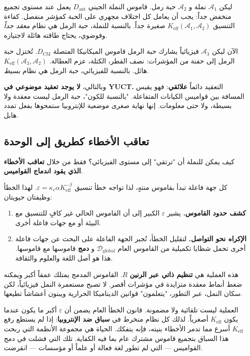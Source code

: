\documentclass[12pt,a4paper]{article}
\newcommand{\Keff}{K_{\mathrm{eff}}}
\begin{document}
	ليكن \(\mathcal{A}_1\) نملة و \(\mathcal{A}_2\) حبة رمل. قاموس النملة الجيني \(D_{\text{ant}}\) يعمل عند مستوى تجميع منخفض جداً: يجب أن يعامل كل اختلاف مجهري على الحبة كمؤشر منفصل. كفاءة التنسيق \(\Keff(\mathcal{A}_1, \mathcal{A}_2)\) صغيرة جداً. بالنسبة للنملة، حبة الرمل هي نظام \emph{معقد جداً} وفوضوي، يحتاج طاقته هائلة لاجتيازه.
	
	الآن ليكن \(\mathcal{A}_3\) فيزيائياً يشارك حبة الرمل قاموس الميكانيكا المتصلة \(D_{\text{CM}}\). تُختزل حبة الرمل إلى حفنة من المؤشرات: نصف القطر، الكتلة، عزم العطالة. \(\Keff(\mathcal{A}_3, \mathcal{A}_2)\) هائل. بالنسبة للفيزيائي، حبة الرمل هي نظام \emph{بسيط}.
	
	وبالتالي، \textbf{لا يوجد تعقيد موضوعي في YUCT.} التعقيد دائماً \textbf{علائقي}: فهو يقيس المسافة بين قواميس الكيانات المتفاعلة. "بالنسبة للكون"، حبة الرمل ليست معقدة ولا بسيطة، ولا حتى معلومات. إنها نهاية صغرى موضعية للإنتروبيا ستمحوها بفعل تمدد هابل.
	
	\subsection{تعاقب الأخطاء كطريق إلى الوحدة}
	\label{subsec:cascade}
	
	كيف يمكن للنملة أن "ترتقي" إلى مستوى الفيزيائي؟ فقط من خلال \textbf{تعاقب الأخطاء الذي يقود اندماج القواميس}.
	
	كل جهة فاعلة تبدأ بقاموس منتهٍ، لذا تواجه خطأ تنسيق \(\varepsilon = \kappa_c \alpha \Keff^{-\beta}\). لهذا الخطأ وظيفتان حيويتان:
	
	\begin{enumerate}[leftmargin=*]
		\item \textbf{كشف حدود القاموس.} يشير \(\varepsilon\) الكبير إلى أن القاموس الحالي غير كافٍ للتنسيق مع البيئة أو مع جهات فاعلة أخرى.
		\item \textbf{الإكراه نحو التواصل.} لتقليل الخطأ، تُجبر الجهة الفاعلة على البحث عن جهات فاعلة أخرى تحمل شظايا تكميلية من القاموس العام \(\mathcal{D}_{\text{global}}\) و \textbf{دمج} قاموسها مع قاموسها. هذا هو أصل اللغة والعلوم والثقافة.
	\end{enumerate}
	
	هذه العملية هي \textbf{تنظيم ذاتي عبر الرنين} \(R\). القاموس المدمج يمتلك عمقاً أكبر ويمكنه ضغط أنماط معقدة متزايدة في مؤشرات أقصر. لا تصبح مستعمرة النمل فيزيائياً، لكن سكان النمل، عبر التطور، "يتعلمون" قوانين الديناميكا الحرارية ويبنون أعشاشاً تطيعها.
	
	العملية ليست تلقائية ولا مضمونة. قانون الخطأ العام يضمن أن \(\varepsilon\) أكبر ما يكون عندما يكون \(\Keff\) أصغرياً. لذلك كل نظام منخرط في \textbf{سباق ضد الإنتروبيا}: إذا لم يستطع رفع \(\Keff\) أسرع مما تدمر الأخطاء بنيته، فإنه يتفكك. الحياة هي مجموعة الأنظمة التي ربحت هذا السباق بتجميع قاموس مشترك عام بما فيه الكفاية. تلك التي فشلت في دمج القواميس — التي لم تطور لغة فعالة أو علماً أو مؤسسات — انقرضت.
	
\end{document}
